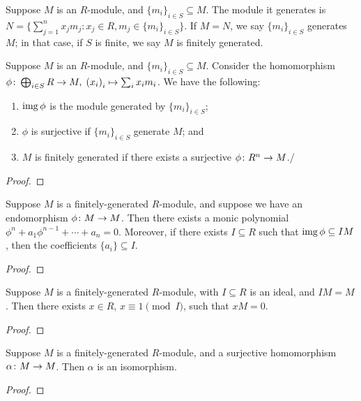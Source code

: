 \begin{definition}
    Suppose \(M\) is an \(R\)-module, and \({\{m_i\}}_{i \in S} \subseteq M\).
    The module it generates is \(N = \{\sum_{j=1}^n x_j m_j : x_j \in R, m_j \in {\{m_i\}}_{i \in S}\}\).
    If \(M = N\), we say \({\{m_i\}}_{i \in S}\) generates \(M\);
    in that case, if \(S\) is finite, we say \(M\) is finitely generated.
\end{definition}
\begin{proposition}
    Suppose \(M\) is an \(R\)-module, and \({\{m_i\}}_{i \in S} \subseteq M\).
    Consider the homomorphism \(\phi\colon\bigoplus_{i \in S} R\to M,\;{(x_i)}_i\mapsto\sum_i x_i m_i\).
    We have the following:
    \begin{enumerate}[label={(\alph*)}, itemsep=0mm]
        \item \(\operatorname{img}\phi\) is the module generated by \({\{m_i\}}_{i \in S}\);
        \item \(\phi\) is surjective if \({\{m_i\}}_{i \in S}\) generate \(M\); and
        \item \(M\) is finitely generated if there exists a surjective \(\phi\colon R^n\to M\)./
    \end{enumerate}
\end{proposition}
\begin{proof}
    
\end{proof}

\begin{lemma}
    Suppose \(M\) is a finitely-generated \(R\)-module,
    and suppose we have an endomorphism \(\phi\colon M\to M\).
    Then there exists a monic polynomial \(\phi^n + a_1\phi^{n-1} + \cdots + a_n = 0\).
    Moreover, if there exists \(I \subseteq R\) such that \(\operatorname{img}\phi \subseteq IM\),
    then the coefficients \(\{a_i\} \subseteq I\).
\end{lemma}
\begin{proof}
    
\end{proof}
\begin{corollary}
    Suppose \(M\) is a finitely-generated \(R\)-module,
    with \(I \subseteq R\) is an ideal, and \(IM = M\).
    Then there exists \(x \in R\), \(x \equiv 1\pmod{I}\), such that \(xM = 0\).
\end{corollary}
\begin{proof}
    
\end{proof}
\begin{corollary}
    Suppose \(M\) is a finitely-generated \(R\)-module,
    and a surjective homomorphism \(\alpha\colon M\to M\).
    Then \(\alpha\) is an isomorphism.
\end{corollary}
\begin{proof}
    
\end{proof}


